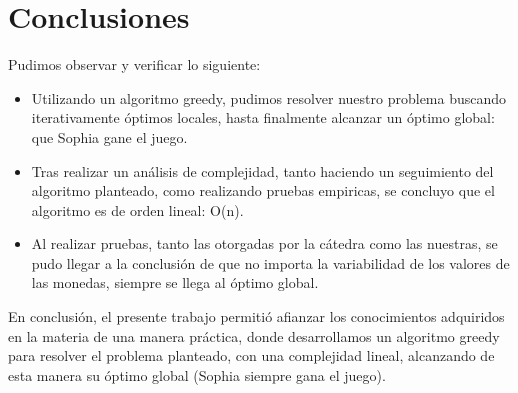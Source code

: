 \section{Conclusiones}

Pudimos observar y verificar lo siguiente:

\begin{itemize}

\item Utilizando un algoritmo greedy, pudimos resolver nuestro problema buscando iterativamente óptimos locales, hasta finalmente alcanzar un óptimo global: que Sophia gane el juego.
\item Tras realizar un análisis de complejidad, tanto haciendo un seguimiento del algoritmo planteado, como realizando pruebas empiricas, se concluyo que el algoritmo es de orden lineal: O(n).
\item Al realizar pruebas, tanto las otorgadas por la cátedra como las nuestras, se pudo llegar a la conclusión de que no importa la variabilidad de los valores de las monedas, siempre se llega al óptimo global.

\end {itemize}

En conclusión, el presente trabajo permitió afianzar los conocimientos adquiridos en la materia de una manera práctica, donde desarrollamos un algoritmo greedy para resolver el problema planteado, con una complejidad lineal, alcanzando de esta manera su óptimo global (Sophia siempre gana el juego).